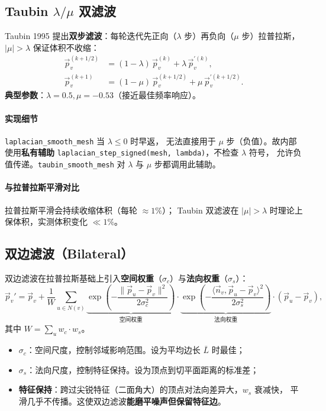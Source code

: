 \documentclass[11pt,a4paper]{article}
\begin{document}
\subsection{Taubin $\lambda/\mu$ 双滤波}

Taubin 1995 提出\textbf{双步滤波}：每轮迭代先正向（$\lambda$ 步）再负向（$\mu$ 步）拉普拉斯，
\textbf{$|\mu| > \lambda$} 保证体积不收缩：
\begin{align}
  \vec{p}_v^{(k+1/2)} &= (1 - \lambda)\, \vec{p}_v^{(k)} + \lambda\, \vec{p}_v^{\prime(k)}, \\
  \vec{p}_v^{(k+1)}   &= (1 - \mu)\, \vec{p}_v^{(k+1/2)} + \mu\, \vec{p}_v^{\prime(k+1/2)}.
\end{align}
\textbf{典型参数}：$\lambda = 0.5, \mu = -0.53$（接近最佳频率响应）。

\paragraph{实现细节} \texttt{laplacian\_smooth\_mesh} 当 $\lambda \le 0$ 时早返，
无法直接用于 $\mu$ 步（负值）。故内部使用\textbf{私有辅助}
\texttt{laplacian\_step\_signed(mesh, lambda)}，不检查 $\lambda$ 符号，
允许负值传递。\texttt{taubin\_smooth\_mesh} 对 $\lambda$ 与 $\mu$ 步都调用此辅助。

\paragraph{与拉普拉斯平滑对比} 拉普拉斯平滑会持续收缩体积（每轮 $\approx 1\%$）；
Taubin 双滤波在 $|\mu| > \lambda$ 时理论上保体积，实测体积变化 $\ll 1\%$。

\subsection{双边滤波（Bilateral）}

双边滤波在拉普拉斯基础上引入\textbf{空间权重}（$\sigma_c$）与\textbf{法向权重}（$\sigma_s$）：
\[
  \vec{p}_v' = \vec{p}_v + \frac{1}{W}\sum_{u \in N(v)}
    \underbrace{\exp\!\left(-\frac{\|\vec{p}_u - \vec{p}_v\|^2}{2\sigma_c^2}\right)}_{\text{空间权重}}
    \cdot \underbrace{\exp\!\left(-\frac{\langle \vec{n}_v, \vec{p}_u - \vec{p}_v \rangle^2}{2\sigma_s^2}\right)}_{\text{法向权重}}
    \cdot (\vec{p}_u - \vec{p}_v),
\]
其中 $W = \sum_u w_c \cdot w_s$。

\begin{itemize}
  \item \textbf{$\sigma_c$}：空间尺度，控制邻域影响范围。设为平均边长 $\bar{L}$ 时最佳；
  \item \textbf{$\sigma_s$}：法向尺度，控制特征保持。设为顶点到切平面距离的标准差；
  \item \textbf{特征保持}：跨过尖锐特征（二面角大）的顶点对法向差异大，$w_s$ 衰减快，
        平滑几乎不传播。这使双边滤波\textbf{能磨平噪声但保留特征边}。
\end{itemize}
\end{document}
